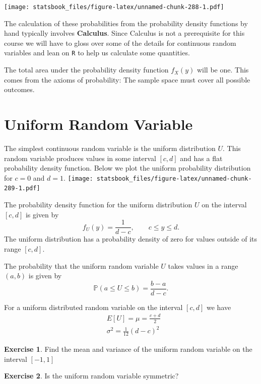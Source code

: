 \documentclass[
]{book}
\theoremstyle{definition}
\theoremstyle{definition}
\theoremstyle{definition}
\newtheorem{exercise}{Exercise}[chapter]
\theoremstyle{definition}
\theoremstyle{remark}
\begin{document}
\texttt{[image: statsbook\_files/figure-latex/unnamed-chunk-288-1.pdf]}

The calculation of these probabilities from the probability density functions by hand typically involves \textbf{Calculus}. Since Calculus is not a prerequisite for this course we will have to gloss over some of the details for continuous random variables and lean on \texttt{R} to help us calculate some quantities.

The total area under the probability density function \(f_X(y)\) will be one. This comes from the axioms of probability: The sample space must cover all possible outcomes.

\hypertarget{uniform-random-variable}{%
\section{Uniform Random Variable}\label{uniform-random-variable}}

The simplest continuous random variable is the uniform distribution \(U\). This random variable produces values in some interval \([c,d]\) and has a flat probability density function. Below we plot the uniform probability distribution for \(c=0\) and \(d=1\).
\texttt{[image: statsbook\_files/figure-latex/unnamed-chunk-289-1.pdf]}

The probability density function for the uniform distribution \(U\) on the interval \([c,d]\) is given by \[f_U(y)=\frac{1}{d-c},\qquad c \leq y \leq d.\] The uniform distribution has a probability density of zero for values outside of its range \([c,d]\).

The probability that the uniform random variable \(U\) takes values in a range \((a,b)\) is given by \[\mathbb{P}(a \leq U \leq b)=\frac{b-a}{d-c}.\]

For a uniform distributed random variable on the interval \([c,d]\) we have
\begin{align}
& E[U]=\mu=\frac{c+d}{2} \\
& \sigma^2=\frac{1}{12}(d-c)^2
\end{align}

\begin{exercise}
\protect\hypertarget{exr:unnamed-chunk-290}{}\label{exr:unnamed-chunk-290}Find the mean and variance of the uniform random variable on the interval \([-1,1]\)
\end{exercise}

\begin{exercise}
\protect\hypertarget{exr:unnamed-chunk-291}{}\label{exr:unnamed-chunk-291}Is the uniform random variable symmetric?
\end{exercise}
\end{document}
